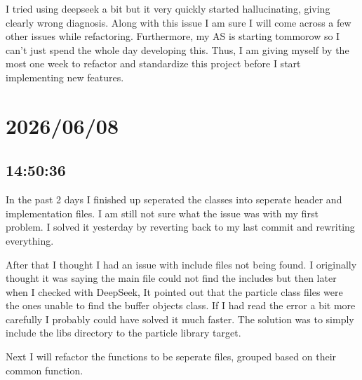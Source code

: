 \documentclass{article}
\begin{document}
I tried using deepseek a bit but it very quickly started hallucinating, giving clearly wrong diagnosis.
Along with this issue I am sure I will come across a few other issues while refactoring. Furthermore, 
my AS is starting tommorow so I can't just spend the whole day developing this. Thus, I am giving myself
by the most one week to refactor and standardize this project before I start implementing new features.

\section*{2026/06/08}
\subsection*{14:50:36}
In the past 2 days I finished up seperated the classes into seperate header and implementation files.
I am still not sure what the issue was with my first problem. I solved it yesterday by reverting back
to my last commit and rewriting everything.

After that I thought I had an issue with include files not being found. I originally thought it was
saying the main file could not find the includes but then later when I checked with DeepSeek, It 
pointed out that the particle class files were the ones unable to find the buffer objects class.
If I had read the error a bit more carefully I probably could have solved it much faster. The 
solution was to simply include the libs directory to the particle library target.

Next I will refactor the functions to be seperate files, grouped based on their common function.
\end{document}
